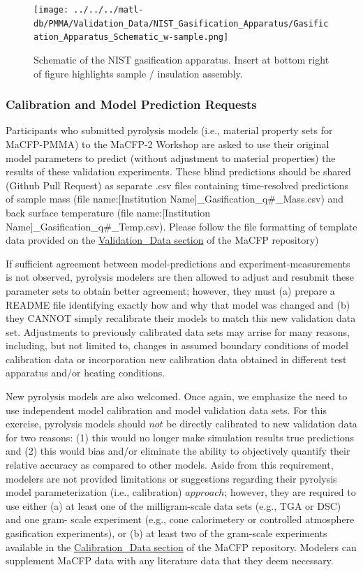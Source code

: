 \documentclass[12pt]{article}
\begin{document}
\begin{figure}
     \centering
         \texttt{[image: ../../../matl-db/PMMA/Validation\_Data/NIST\_Gasification\_Apparatus/Gasification\_Apparatus\_Schematic\_w-sample.png]}
         \caption{ Schematic of the NIST gasification apparatus. Insert at bottom right of figure highlights sample / insulation assembly.}
         \label{fig:NISTGasApp}
\end{figure}

\subsubsection*{Calibration and Model Prediction Requests }
Participants who submitted pyrolysis models (i.e., material property sets for MaCFP-PMMA) to the MaCFP-2 Workshop are asked to use their original model parameters to predict (without adjustment to material properties) the results of these validation experiments. These blind predictions should be shared (Github Pull Request) as separate .csv files containing time-resolved predictions of sample mass (file name:[Institution Name]\_Gasification\_q\#\_Mass.csv) and back surface temperature (file name:[Institution Name]\_Gasification\_q\#\_Temp.csv). Please follow the file formatting of template data provided on the \href{https://github.com/MaCFP/matl-db/tree/master/PMMA/Validation_Data/NIST_Gasification_Apparatus}{Validation\_Data section} of the MaCFP repository)

If sufficient agreement between model-predictions and experiment-measurements is not observed, pyrolysis modelers are then allowed to adjust and resubmit these parameter sets to obtain better agreement; however, they must (a) prepare a README file identifying exactly how and why that model was changed and (b) they CANNOT simply recalibrate their models to match this new validation data set.  Adjustments to previously calibrated data sets may arrise for many reasons, including,  but not limited to, changes in assumed boundary conditions of model calibration data or incorporation new calibration data obtained in different test apparatus and/or heating conditions.

New pyrolysis models are also welcomed. Once again, we emphasize the need to use independent model calibration and model validation data sets. For this exercise, pyrolysis models should $not$ be directly calibrated to new validation data for two reasons: (1) this would no longer make simulation results true predictions and (2) this would bias and/or eliminate the ability to objectively quantify their relative accuracy as compared to other models. Aside from this requirement, modelers are not provided limitations or suggestions regarding their pyrolysis model parameterization (i.e., calibration) $approach$; however, they are required to use either (a) at least one of the milligram-scale data sets (e.g., TGA or DSC) and one gram- scale experiment (e.g., cone calorimetery or controlled atmosphere gasification experiments), or (b) at least two of the gram-scale experiments available in the \href{https://github.com/MaCFP/matl-db/tree/master/PMMA/Calibration_Data}{Calibration\_Data section} of the MaCFP repository. Modelers can supplement MaCFP data with any literature data that they deem necessary. 
\end{document}
